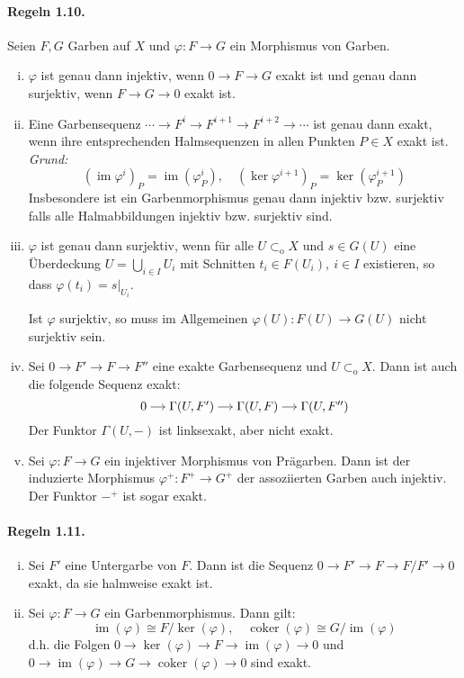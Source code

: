 \documentclass[11pt,b5paper,openany]{memoir}
\begin{document}
\paragraph{Regeln 1.10.}\label{1.10} Seien $F,G$ Garben auf $X$ und $\varphi:F\to G$ ein Morphismus von Garben.
\begin{enumerate}[(i)]
\item $\varphi$ ist genau dann injektiv, wenn $0\to F\to G$ exakt ist und genau dann surjektiv, wenn $F\to G\to 0$ exakt ist.
\item Eine Garbensequenz $\cdots \to F^i\to F^{i+1}\to F^{i+2}\to\cdots$ ist genau dann exakt, wenn ihre entsprechenden Halmsequenzen in allen Punkten $P\in X$ exakt ist. \textit{Grund:}
\[(\operatorname{im} \varphi^i)_P=\operatorname{im}(\varphi^i_P),\quad (\ker\varphi^{i+1})_P=\ker(\varphi^{i+1}_P) \]
Insbesondere ist ein Garbenmorphismus genau dann injektiv bzw. surjektiv falls alle Halmabbildungen injektiv bzw. surjektiv sind.
\item $\varphi$ ist genau dann surjektiv, wenn für alle $U\subset_\text{o}X$ und $s\in G(U)$ eine Überdeckung $U=\bigcup_{i\in I} U_i$ mit Schnitten $t_i\in F(U_i),\ i\in I$ existieren, so dass $\varphi(t_i)=s|_{U_i}$.

Ist $\varphi$ surjektiv, so muss im Allgemeinen $\varphi(U):F(U)\to G(U)$ nicht surjektiv sein.
\item Sei $0\to F'\to F\to F''$ eine exakte Garbensequenz und $U\subset_\text{o}X$. Dann ist auch die folgende Sequenz exakt:
\[\begin{tikzcd}[cramped, sep=small]
0 \ar[r] & \Gamma(U,F') \ar[r]& \Gamma(U,F) \ar[r]& \Gamma(U,F'')
\end{tikzcd} \]
Der Funktor $\Gamma(U,-)$ ist linksexakt, aber nicht exakt.
\item Sei $\varphi:F\to G$ ein injektiver Morphismus von Prägarben. Dann ist der induzierte Morphismus $\varphi^+:F^+\to G^+$ der assoziierten Garben auch injektiv. Der Funktor $-^+$ ist sogar exakt.
\end{enumerate}

\paragraph{Regeln 1.11.}\label{1.11} \begin{enumerate}[(i)]
\item Sei $F'$ eine Untergarbe von $F$. Dann ist die Sequenz $0\to F'\to F\to F/F'\to 0$ exakt, da sie halmweise exakt ist.
\item Sei $\varphi:F\to G$ ein Garbenmorphismus. Dann gilt:
\[\operatorname{im}(\varphi)\cong F/\ker(\varphi),\quad \operatorname{coker}(\varphi)\cong G/ \operatorname{im}(\varphi) \]
d.h. die Folgen $0\to\ker(\varphi)\to F\to\operatorname{im}(\varphi)\to 0$ und $0\to\operatorname{im}(\varphi)\to G\to\operatorname{coker}(\varphi)\to 0$ sind exakt.
\end{enumerate}
\end{document}
